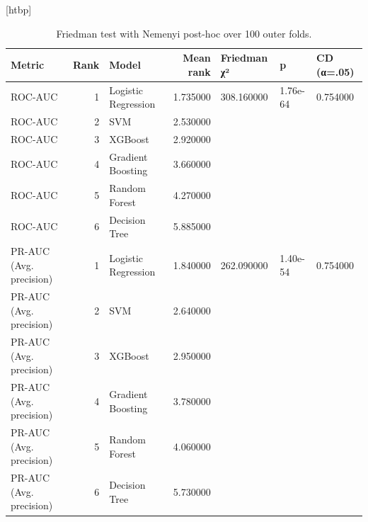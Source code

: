 \begin{table}
\small[htbp]
\caption{Friedman test with Nemenyi post-hoc over 100 outer folds.}
\label{tab:P04_friedman_nemenyi}
\begin{tabular}{lrlrlll}
\toprule
Metric & Rank & Model & Mean rank & Friedman χ² & p & CD (α=.05) \\
\midrule
ROC-AUC & 1 & Logistic Regression & 1.735000 & 308.160000 & 1.76e-64 & 0.754000 \\
ROC-AUC & 2 & SVM & 2.530000 &  &  &  \\
ROC-AUC & 3 & XGBoost & 2.920000 &  &  &  \\
ROC-AUC & 4 & Gradient Boosting & 3.660000 &  &  &  \\
ROC-AUC & 5 & Random Forest & 4.270000 &  &  &  \\
ROC-AUC & 6 & Decision Tree & 5.885000 &  &  &  \\
PR-AUC (Avg. precision) & 1 & Logistic Regression & 1.840000 & 262.090000 & 1.40e-54 & 0.754000 \\
PR-AUC (Avg. precision) & 2 & SVM & 2.640000 &  &  &  \\
PR-AUC (Avg. precision) & 3 & XGBoost & 2.950000 &  &  &  \\
PR-AUC (Avg. precision) & 4 & Gradient Boosting & 3.780000 &  &  &  \\
PR-AUC (Avg. precision) & 5 & Random Forest & 4.060000 &  &  &  \\
PR-AUC (Avg. precision) & 6 & Decision Tree & 5.730000 &  &  &  \\
\bottomrule
\end{tabular}
\end{table}
